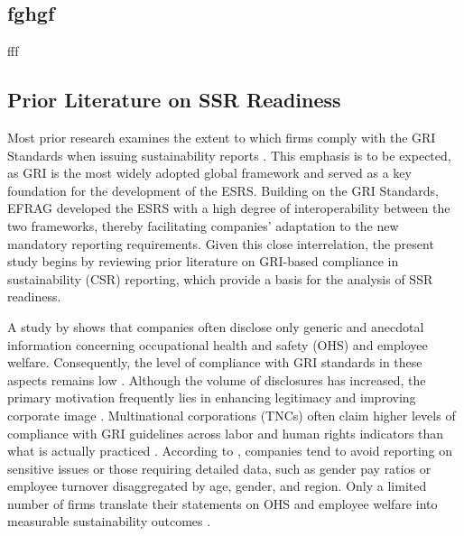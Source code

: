 \subsection{fghgf}

fff

\subsection{Prior Literature on SSR Readiness}

Most prior research examines the extent to which firms comply with the GRI Standards 
when issuing sustainability reports \parencite{Fonseca2014, Vigneau2015}. 
This emphasis is to be expected, as GRI is the most widely adopted global framework 
\parencite{Bebbington2012, Mahoney2013} and served as a key foundation 
for the development of the ESRS. Building on the GRI Standards, EFRAG developed 
the ESRS with a high degree of interoperability 
between the two frameworks, thereby facilitating companies' adaptation to the new mandatory 
reporting requirements. Given this close interrelation, the present study begins 
by reviewing prior literature on GRI-based compliance in sustainability (CSR) reporting, 
which provide a basis for the analysis of SSR readiness.

A study by \textcite{Mariappanadar2022} shows that companies often disclose only generic 
and anecdotal information concerning occupational health and safety (OHS) and employee welfare. 
Consequently, the level of compliance with GRI standards in these aspects remains low 
\parencite{Mariappanadar2022}. Although the volume of disclosures has increased, the primary 
motivation frequently lies in enhancing legitimacy and improving corporate image 
\parencite{Chauvey2015}. Multinational corporations (TNCs) often claim higher levels of 
compliance with GRI guidelines across labor and human rights indicators 
than what is actually practiced \parencite{Parsa2018}. According to \textcite{Parsa2018}, 
companies tend to avoid reporting on sensitive issues or those requiring detailed data, 
such as gender pay ratios or employee turnover disaggregated by age, gender, and region. 
Only a limited number of firms translate their statements on OHS and employee welfare 
into measurable sustainability outcomes \parencite{Mariappanadar2022}.


